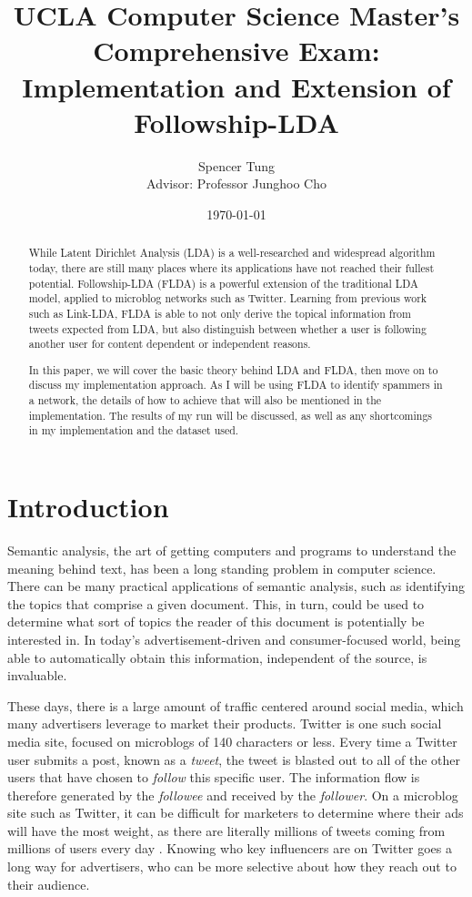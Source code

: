 \documentclass[a4paper]{article}
\title{UCLA Computer Science Master's Comprehensive Exam: Implementation and Extension of Followship-LDA}
\author{Spencer Tung \\ Advisor: Professor Junghoo Cho}
\date{\today}
\begin{document}
\maketitle

\begin{abstract}
While Latent Dirichlet Analysis (LDA) is a well-researched and widespread algorithm today, there are still many places where its applications have not reached their fullest potential. Followship-LDA (FLDA) is a powerful extension of the traditional LDA model, applied to microblog networks such as Twitter. Learning from previous work such as Link-LDA, FLDA is able to not only derive the topical information from tweets expected from LDA, but also distinguish between whether a user is following another user for content dependent or independent reasons.

In this paper, we will cover the basic theory behind LDA and FLDA, then move on to discuss my implementation approach. As I will be using FLDA to identify spammers in a network, the details of how to achieve that will also be mentioned in the implementation. The results of my run will be discussed, as well as any shortcomings in my implementation and the dataset used.
\end{abstract}

\section{Introduction}
Semantic analysis, the art of getting computers and programs to understand the meaning behind text, has been a long standing problem in computer science. There can be many practical applications of semantic analysis, such as identifying the topics that comprise a given document. This, in turn, could be used to determine what sort of topics the reader of this document is potentially be interested in. In today's advertisement-driven and consumer-focused world, being able to automatically obtain this information, independent of the source, is invaluable.

These days, there is a large amount of traffic centered around social media, which many advertisers leverage to market their products. Twitter is one such social media site, focused on microblogs of 140 characters or less. Every time a Twitter user submits a post, known as a \textit{tweet}, the tweet is blasted out to all of the other users that have chosen to \textit{follow} this specific user. The information flow is therefore generated by the \textit{followee} and received by the \textit{follower}. On a microblog site such as Twitter, it can be difficult for marketers to determine where their ads will have the most weight, as there are literally millions of tweets coming from millions of users every day \cite{TODO}. Knowing who key influencers are on Twitter goes a long way for advertisers, who can be more selective about how they reach out to their audience.
\end{document}
